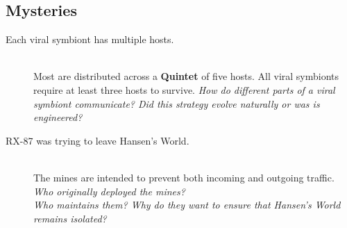 \documentclass[11pt, a5paper, parskip=half-, DIV=12]{scrartcl}
\begin{document}
\subsection*{Mysteries}
\begin{description}
	\item[Each viral symbiont has multiple hosts.] \phantom{a} \\ Most are distributed across a \textbf{Quintet} of five hosts. All viral symbionts require at least three hosts to survive. \textit{How do different parts of a viral symbiont communicate? Did this strategy evolve naturally or was is engineered?}
	\item[RX-87 was trying to leave Hansen's World.] \phantom{a} \\ The mines are intended to prevent both incoming and outgoing traffic. \textit{Who originally deployed the mines?  \\ Who maintains them? Why do they want to ensure that Hansen's World remains isolated?}
\end{description}

\newpage



\newpage

\thispagestyle{empty}


\ClearShipoutPicture
{}

\phantom{a}
\end{document}
